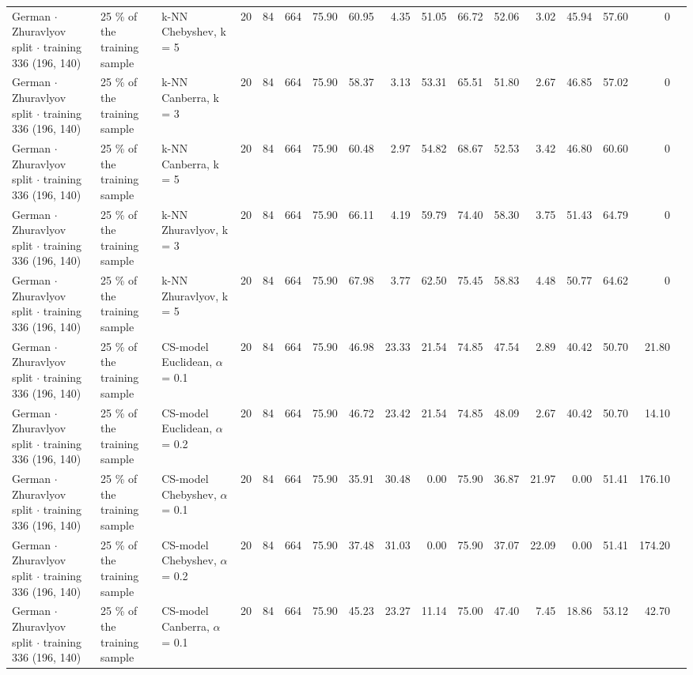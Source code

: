 \begin{longtable}{lllrrrrrrrrrrrrrl}
  German $\cdot$ Zhuravlyov split $\cdot$ training 336 (196, 140) & 25 \% of the training sample & k-NN Chebyshev, k = 5 & 20 & 84 & 664 & 75.90 & 60.95 & 4.35 & 51.05 & 66.72 & 52.06 & 3.02 & 45.94 & 57.60 & 0 &  \\
  German $\cdot$ Zhuravlyov split $\cdot$ training 336 (196, 140) & 25 \% of the training sample & k-NN Canberra, k = 3 & 20 & 84 & 664 & 75.90 & 58.37 & 3.13 & 53.31 & 65.51 & 51.80 & 2.67 & 46.85 & 57.02 & 0 &  \\
  German $\cdot$ Zhuravlyov split $\cdot$ training 336 (196, 140) & 25 \% of the training sample & k-NN Canberra, k = 5 & 20 & 84 & 664 & 75.90 & 60.48 & 2.97 & 54.82 & 68.67 & 52.53 & 3.42 & 46.80 & 60.60 & 0 &  \\
  German $\cdot$ Zhuravlyov split $\cdot$ training 336 (196, 140) & 25 \% of the training sample & k-NN Zhuravlyov, k = 3 & 20 & 84 & 664 & 75.90 & 66.11 & 4.19 & 59.79 & 74.40 & 58.30 & 3.75 & 51.43 & 64.79 & 0 &  \\
  German $\cdot$ Zhuravlyov split $\cdot$ training 336 (196, 140) & 25 \% of the training sample & k-NN Zhuravlyov, k = 5 & 20 & 84 & 664 & 75.90 & 67.98 & 3.77 & 62.50 & 75.45 & 58.83 & 4.48 & 50.77 & 64.62 & 0 &  \\
  German $\cdot$ Zhuravlyov split $\cdot$ training 336 (196, 140) & 25 \% of the training sample & CS-model Euclidean, $\alpha$ = 0.1 & 20 & 84 & 664 & 75.90 & 46.98 & 23.33 & 21.54 & 74.85 & 47.54 & 2.89 & 40.42 & 50.70 & 21.80 &  \\
  German $\cdot$ Zhuravlyov split $\cdot$ training 336 (196, 140) & 25 \% of the training sample & CS-model Euclidean, $\alpha$ = 0.2 & 20 & 84 & 664 & 75.90 & 46.72 & 23.42 & 21.54 & 74.85 & 48.09 & 2.67 & 40.42 & 50.70 & 14.10 &  \\
  German $\cdot$ Zhuravlyov split $\cdot$ training 336 (196, 140) & 25 \% of the training sample & CS-model Chebyshev, $\alpha$ = 0.1 & 20 & 84 & 664 & 75.90 & 35.91 & 30.48 & 0.00 & 75.90 & 36.87 & 21.97 & 0.00 & 51.41 & 176.10 &  \\
  German $\cdot$ Zhuravlyov split $\cdot$ training 336 (196, 140) & 25 \% of the training sample & CS-model Chebyshev, $\alpha$ = 0.2 & 20 & 84 & 664 & 75.90 & 37.48 & 31.03 & 0.00 & 75.90 & 37.07 & 22.09 & 0.00 & 51.41 & 174.20 &  \\
  German $\cdot$ Zhuravlyov split $\cdot$ training 336 (196, 140) & 25 \% of the training sample & CS-model Canberra, $\alpha$ = 0.1 & 20 & 84 & 664 & 75.90 & 45.23 & 23.27 & 11.14 & 75.00 & 47.40 & 7.45 & 18.86 & 53.12 & 42.70 &  \\

\end{longtable}
